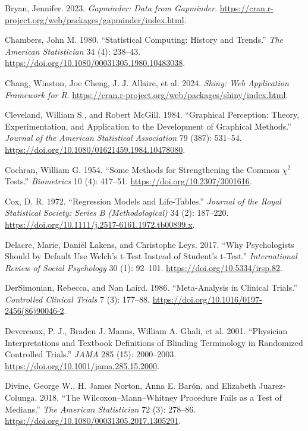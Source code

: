 \documentclass[
]{book}
\newlength{\cslhangindent}
\newenvironment{CSLReferences}[2] %
 {\begin{list}{}{%
  \setlength{\itemindent}{0pt}
  \setlength{\leftmargin}{0pt}
  \setlength{\parsep}{0pt}
  \ifodd #1
   \setlength{\leftmargin}{\cslhangindent}
   \setlength{\itemindent}{-1\cslhangindent}
  \fi
  \setlength{\itemsep}{#2\baselineskip}}}
 {\end{list}}
\begin{document}
\begin{CSLReferences}{1}{1}
Bryan, Jennifer. 2023. \emph{Gapminder: Data from Gapminder}. \url{https://cran.r-project.org/web/packages/gapminder/index.html}.

Chambers, John M. 1980. {``Statistical Computing: History and Trends.''} \emph{The American Statistician} 34 (4): 238--43. \url{https://doi.org/10.1080/00031305.1980.10483038}.

Chang, Winston, Joe Cheng, J. J. Allaire, et al. 2024. \emph{Shiny: Web Application Framework for {R}}. \url{https://cran.r-project.org/web/packages/shiny/index.html}.

Cleveland, William S., and Robert McGill. 1984. {``Graphical Perception: Theory, Experimentation, and Application to the Development of Graphical Methods.''} \emph{Journal of the American Statistical Association} 79 (387): 531--54. \url{https://doi.org/10.1080/01621459.1984.10478080}.

Cochran, William G. 1954. {``Some Methods for Strengthening the Common \(\chi^2\) Tests.''} \emph{Biometrics} 10 (4): 417--51. \url{https://doi.org/10.2307/3001616}.

Cox, D. R. 1972. {``Regression Models and Life-Tables.''} \emph{Journal of the Royal Statistical Society: Series B (Methodological)} 34 (2): 187--220. \url{https://doi.org/10.1111/j.2517-6161.1972.tb00899.x}.

Delacre, Marie, Daniël Lakens, and Christophe Leys. 2017. {``Why Psychologists Should by Default Use {Welch's} t-Test Instead of {Student's} t-Test.''} \emph{International Review of Social Psychology} 30 (1): 92--101. \url{https://doi.org/10.5334/irsp.82}.

DerSimonian, Rebecca, and Nan Laird. 1986. {``Meta-Analysis in Clinical Trials.''} \emph{Controlled Clinical Trials} 7 (3): 177--88. \url{https://doi.org/10.1016/0197-2456(86)90046-2}.

Devereaux, P. J., Braden J. Manns, William A. Ghali, et al. 2001. {``Physician Interpretations and Textbook Definitions of Blinding Terminology in Randomized Controlled Trials.''} \emph{JAMA} 285 (15): 2000--2003. \url{https://doi.org/10.1001/jama.285.15.2000}.

Divine, George W., H. James Norton, Anna E. Barón, and Elizabeth Juarez-Colunga. 2018. {``The {Wilcoxon--Mann--Whitney} Procedure Fails as a Test of Medians.''} \emph{The American Statistician} 72 (3): 278--86. \url{https://doi.org/10.1080/00031305.2017.1305291}.


\end{CSLReferences}
\end{document}
